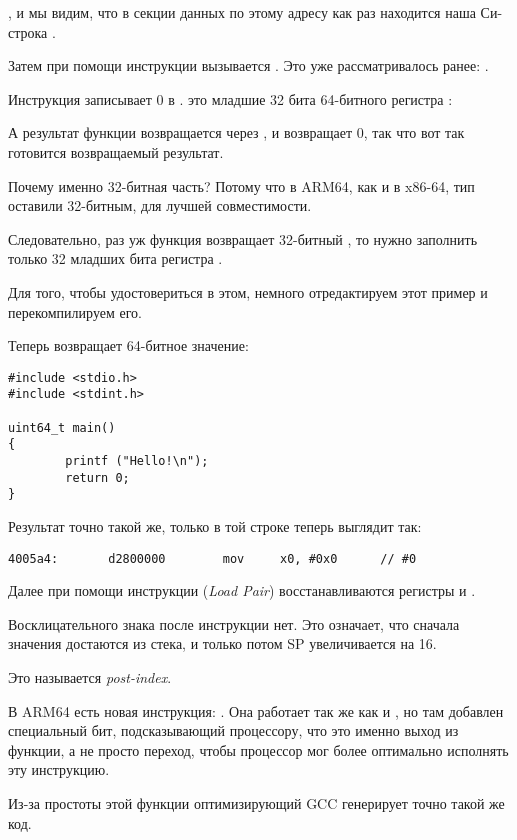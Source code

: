 , и мы видим, что в секции данных  по этому адресу как раз находится наша
Си-строка .

Затем при помощи инструкции  вызывается \puts. Это уже рассматривалось ранее: .

Инструкция \MOV записывает 0 в . 
 это младшие 32 бита 64-битного регистра :



А результат функции возвращается через , и \main возвращает 0, 
так что вот так готовится возвращаемый результат.

Почему именно 32-битная часть?
Потому что в ARM64, как и в x86-64, тип \Tint оставили 32-битным, для лучшей совместимости.

Следовательно, раз уж функция возвращает 32-битный \Tint, то нужно заполнить только 32 младших бита регистра .

Для того, чтобы удостовериться в этом, немного отредактируем этот пример и перекомпилируем его.%

Теперь \main возвращает 64-битное значение:

\begin{lstlisting}[caption=\main возвращающая значение типа \TT{uint64\_t},style=customc]
#include <stdio.h>
#include <stdint.h>

uint64_t main()
{
        printf ("Hello!\n");
        return 0;
}
\end{lstlisting}

Результат точно такой же, только \MOV в той строке теперь выглядит так:

\begin{lstlisting}[caption=\NonOptimizing GCC 4.8.1 + objdump]
  4005a4:       d2800000        mov     x0, #0x0      // #0
\end{lstlisting}

Далее при помощи инструкции  (\emph{Load Pair}) восстанавливаются регистры  и .

Восклицательного знака после инструкции нет. Это означает, что сначала значения достаются из стека, и только потом \ac{SP} увеличивается на 16.

Это называется \emph{post-index}.

В ARM64 есть новая инструкция: \RET. 
Она работает так же как и , но там добавлен специальный бит,
подсказывающий процессору, что это именно выход из функции, а не просто переход, чтобы процессор
мог более оптимально исполнять эту инструкцию.

Из-за простоты этой функции оптимизирующий GCC генерирует точно такой же код.

